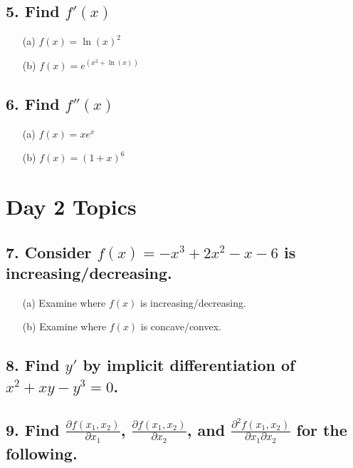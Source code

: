 \documentclass{article}
\begin{document}
\subsection*{5. Find \( f'(x) \)}

\begin{itemize}
    \item[(a)] \( f(x) = \ln(x)^2 \)
    \item[(b)] \( f(x) = e^{(x^2 + \ln(x))} \)
\end{itemize}

\subsection*{6. Find \( f''(x) \)}

\begin{itemize}
    \item[(a)] \( f(x) = xe^{x} \)
    \item[(b)] \( f(x) = (1 + x)^{6} \)
\end{itemize}

\section*{Day 2 Topics}

\subsection*{7. Consider \( f(x) = -x^3 + 2x^2 - x - 6 \) is increasing/decreasing.}
\begin{itemize}
    \item[(a)] Examine where \( f(x) \) is increasing/decreasing.
    \item[(b)] Examine where \( f(x) \) is concave/convex.
\end{itemize}
   
\subsection*{8. Find \( y' \) by implicit differentiation of \( x^2 + xy - y^3 = 0 \).}

\subsection*{9. Find \( \frac{\partial f(x_1, x_2)}{\partial x_1} \), \( \frac{\partial f(x_1, x_2)}{\partial x_2} \), and \( \frac{\partial^2 f(x_1, x_2)}{\partial x_1 \partial x_2} \) for the following.}
\end{document}
